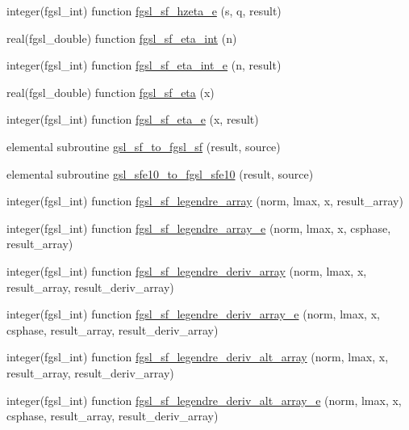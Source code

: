\begin{DoxyCompactItemize}
integer(fgsl\+\_\+int) function \hyperlink{specfunc_8finc_afb41b3e3377e51e351583156fd9c9190}{fgsl\+\_\+sf\+\_\+hzeta\+\_\+e} (s, q, result)
\item 
real(fgsl\+\_\+double) function \hyperlink{specfunc_8finc_aea4cbe49ad0822e1ec94dc6bff365190}{fgsl\+\_\+sf\+\_\+eta\+\_\+int} (n)
\item 
integer(fgsl\+\_\+int) function \hyperlink{specfunc_8finc_a0c3b0e24d1a6bcd28adbe3b233f4ecc2}{fgsl\+\_\+sf\+\_\+eta\+\_\+int\+\_\+e} (n, result)
\item 
real(fgsl\+\_\+double) function \hyperlink{specfunc_8finc_a32b1b6c6849c131cd0b836d6af4a6cae}{fgsl\+\_\+sf\+\_\+eta} (x)
\item 
integer(fgsl\+\_\+int) function \hyperlink{specfunc_8finc_a38802183c57ee1d71a8fe1fbb635a69e}{fgsl\+\_\+sf\+\_\+eta\+\_\+e} (x, result)
\item 
elemental subroutine \hyperlink{specfunc_8finc_ab7a244077f80b9af6ea47fff561ce5b2}{gsl\+\_\+sf\+\_\+to\+\_\+fgsl\+\_\+sf} (result, source)
\item 
elemental subroutine \hyperlink{specfunc_8finc_ad836c9890e9d3696c58e0fe5e1d4f117}{gsl\+\_\+sfe10\+\_\+to\+\_\+fgsl\+\_\+sfe10} (result, source)
\item 
integer(fgsl\+\_\+int) function \hyperlink{specfunc_8finc_a8d0bd924a8ff90ec96ac4476b6104913}{fgsl\+\_\+sf\+\_\+legendre\+\_\+array} (norm, lmax, x, result\+\_\+array)
\item 
integer(fgsl\+\_\+int) function \hyperlink{specfunc_8finc_a04c8947ad177dc967514dde932c2609b}{fgsl\+\_\+sf\+\_\+legendre\+\_\+array\+\_\+e} (norm, lmax, x, csphase, result\+\_\+array)
\item 
integer(fgsl\+\_\+int) function \hyperlink{specfunc_8finc_ae109dbfd66b94544362c58fd65f1da18}{fgsl\+\_\+sf\+\_\+legendre\+\_\+deriv\+\_\+array} (norm, lmax, x, result\+\_\+array, result\+\_\+deriv\+\_\+array)
\item 
integer(fgsl\+\_\+int) function \hyperlink{specfunc_8finc_a2374471a2375130e324bace8d35b5f7d}{fgsl\+\_\+sf\+\_\+legendre\+\_\+deriv\+\_\+array\+\_\+e} (norm, lmax, x, csphase, result\+\_\+array, result\+\_\+deriv\+\_\+array)
\item 
integer(fgsl\+\_\+int) function \hyperlink{specfunc_8finc_a186eb68c7c2974ec32147bfacf812db8}{fgsl\+\_\+sf\+\_\+legendre\+\_\+deriv\+\_\+alt\+\_\+array} (norm, lmax, x, result\+\_\+array, result\+\_\+deriv\+\_\+array)
\item 
integer(fgsl\+\_\+int) function \hyperlink{specfunc_8finc_aeaf459a3c6357029d3369eda57f5803d}{fgsl\+\_\+sf\+\_\+legendre\+\_\+deriv\+\_\+alt\+\_\+array\+\_\+e} (norm, lmax, x, csphase, result\+\_\+array, result\+\_\+deriv\+\_\+array)

\end{DoxyCompactItemize}
